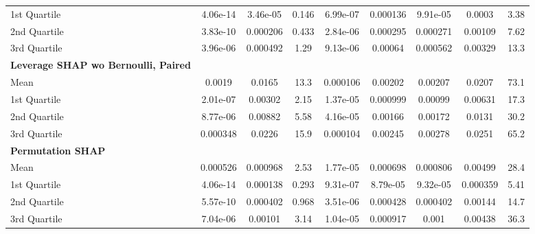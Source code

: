 {\begin{tabular} {lcccccccc}
\hspace{7pt}1st Quartile & 4.06e-14 & \cellcolor{silver!60}3.46e-05 & \cellcolor{silver!60}0.146 & \cellcolor{silver!60}6.99e-07 & \cellcolor{silver!60}0.000136 & \cellcolor{bronze!60}9.91e-05 & \cellcolor{gold!60}0.0003 & \cellcolor{gold!60}3.38 \\ 
\hspace{7pt}2nd Quartile & \cellcolor{bronze!60}3.83e-10 & \cellcolor{silver!60}0.000206 & \cellcolor{silver!60}0.433 & \cellcolor{bronze!60}2.84e-06 & \cellcolor{gold!60}0.000295 & \cellcolor{silver!60}0.000271 & \cellcolor{gold!60}0.00109 & \cellcolor{gold!60}7.62 \\ 
\hspace{7pt}3rd Quartile & 3.96e-06 & \cellcolor{silver!60}0.000492 & \cellcolor{silver!60}1.29 & \cellcolor{bronze!60}9.13e-06 & \cellcolor{silver!60}0.00064 & \cellcolor{silver!60}0.000562 & \cellcolor{gold!60}0.00329 & \cellcolor{gold!60}13.3 \\ 
\addlinespace[1ex] 
\textbf{Leverage SHAP wo Bernoulli, Paired} &  &  &  &  &  &  &  &  \\ 
\hspace{7pt}Mean & 0.0019 & 0.0165 & 13.3 & 0.000106 & 0.00202 & 0.00207 & 0.0207 & 73.1 \\ 
\hspace{7pt}1st Quartile & 2.01e-07 & 0.00302 & 2.15 & 1.37e-05 & 0.000999 & 0.00099 & 0.00631 & 17.3 \\ 
\hspace{7pt}2nd Quartile & 8.77e-06 & 0.00882 & 5.58 & 4.16e-05 & 0.00166 & 0.00172 & 0.0131 & 30.2 \\ 
\hspace{7pt}3rd Quartile & 0.000348 & 0.0226 & 15.9 & 0.000104 & 0.00245 & 0.00278 & 0.0251 & 65.2 \\ 
\addlinespace[1ex] 
\textbf{Permutation SHAP} &  &  &  &  &  &  &  &  \\ 
\hspace{7pt}Mean & 0.000526 & 0.000968 & 2.53 & 1.77e-05 & 0.000698 & 0.000806 & \cellcolor{bronze!60}0.00499 & 28.4 \\ 
\hspace{7pt}1st Quartile & \cellcolor{bronze!60}4.06e-14 & 0.000138 & 0.293 & 9.31e-07 & \cellcolor{gold!60}8.79e-05 & \cellcolor{gold!60}9.32e-05 & \cellcolor{bronze!60}0.000359 & \cellcolor{bronze!60}5.41 \\ 
\hspace{7pt}2nd Quartile & 5.57e-10 & 0.000402 & 0.968 & 3.51e-06 & \cellcolor{bronze!60}0.000428 & 0.000402 & \cellcolor{silver!60}0.00144 & 14.7 \\ 
\hspace{7pt}3rd Quartile & 7.04e-06 & 0.00101 & 3.14 & 1.04e-05 & \cellcolor{bronze!60}0.000917 & 0.001 & \cellcolor{bronze!60}0.00438 & 36.3 \\ 
\bottomrule
\end{tabular}}